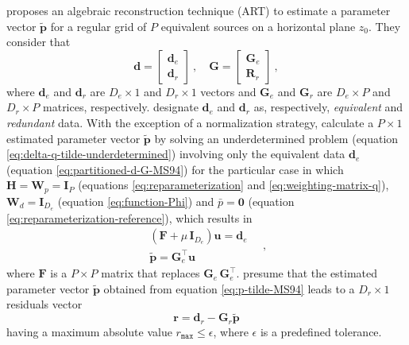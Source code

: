 \cite{mendonca-silva1994} proposes an algebraic reconstruction technique (ART) \cite[e.g.,][p. 58]{sluis-vorst1987}
to estimate a parameter vector $\tilde{\mathbf{p}}$ for a regular grid of $P$ equivalent sources on a horizontal plane $z_{0}$.
They consider that
\begin{equation}
	\mathbf{d} = \begin{bmatrix}
		\mathbf{d}_{e} \\ \mathbf{d}_{r}
	\end{bmatrix} \: , \quad 
	\mathbf{G} = \begin{bmatrix}
		\mathbf{G}_{e} \\ \mathbf{R}_{r}
	\end{bmatrix} \: ,
	\label{eq:partitioned-d-G-MS94}
\end{equation}
where $\mathbf{d}_{e}$ and $\mathbf{d}_{r}$ are $D_{e} \times 1$ and $D_{r} \times 1$ vectors and
$\mathbf{G}_{e}$ and $\mathbf{G}_{r}$ are $D_{e} \times P$ and $D_{r} \times P$ matrices, respectively.
\cite{mendonca-silva1994} designate $\mathbf{d}_{e}$ and $\mathbf{d}_{r}$ as, respectively, \textit{equivalent} and \textit{redundant} data.
With the exception of a normalization strategy, \cite{mendonca-silva1994} calculate a $P \times 1$ estimated parameter vector $\tilde{\mathbf{p}}$ 
by solving an underdetermined problem (equation \ref{eq:delta-q-tilde-underdetermined}) involving only the equivalent data $\mathbf{d}_{e}$ 
(equation \ref{eq:partitioned-d-G-MS94})
for the particular case in which $\mathbf{H} = \mathbf{W}_{p} = \mathbf{I}_{P}$ (equations \ref{eq:reparameterization} and \ref{eq:weighting-matrix-q}),
$\mathbf{W}_{d} = \mathbf{I}_{D_{e}}$ (equation \ref{eq:function-Phi}) and $\bar{p} = \mathbf{0}$ (equation \ref{eq:reparameterization-reference}), 
which results in
\begin{equation}
	\begin{split}
		\left(\mathbf{F} + \mu \, \mathbf{I}_{D_{e}} \right) \mathbf{u} = \mathbf{d}_{e} \\
		\tilde{\mathbf{p}} = \mathbf{G}_{e}^{\top} \mathbf{u}
	\end{split} \quad ,
	\label{eq:p-tilde-MS94}
\end{equation}
where $\mathbf{F}$ is a $P \times P$ matrix that replaces $\mathbf{G}_{e} \, \mathbf{G}_{e}^{\top}$.
\cite{mendonca-silva1994} presume that the estimated parameter vector $\tilde{\mathbf{p}}$ obtained from equation \ref{eq:p-tilde-MS94}
leads to a $D_{r} \times 1$ residuals vector
\begin{equation}
	\mathbf{r} = \mathbf{d}_{r} - \mathbf{G}_{r} \tilde{\mathbf{p}} 
	\label{eq:residuals-MS94}
\end{equation}
having a maximum absolute value $r_{\mathtt{max}} \le \epsilon$, where $\epsilon$ is a predefined tolerance.

